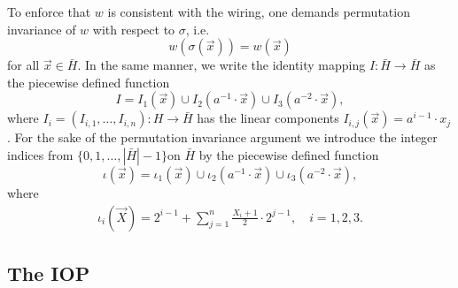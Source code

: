 \documentclass[11pt]{article}
\theoremstyle{definition}
\theoremstyle{remark}
\begin{document}
To enforce that $w$ is consistent with the wiring, one demands permutation invariance of $w$ with respect to $\sigma$, i.e.
\begin{equation}
\label{e:PermutationInvariance}
w (\sigma(\vec x)) =  w(\vec x)
\end{equation}
for all $\vec x\in \bar H$.
In the same manner, we write the identity mapping $I: \bar H\longrightarrow \bar H$ as the piecewise defined function
\[
I = I_1(\vec x) \cup I_2(a^{-1}\cdot \vec x) \cup I_3(a^{-2}\cdot \vec x),
\]
where $I_i = (I_{i,1},\ldots, I_{i,n}): H\rightarrow \bar H$ has the linear components $I_{i,j}(\vec x) = a^{i-1}\cdot  x_j$.
For the sake of the permutation invariance argument we introduce the integer indices from $\{0, 1, \ldots, |\bar H|- 1\}$on $\bar H$ by the piecewise defined function
\begin{equation}
\label{e:iota}
\iota(\vec x) = \iota_1(\vec x) \cup \iota_2(a^{-1}\cdot \vec x) \cup \iota_3(a^{-2}\cdot \vec x),
\end{equation}
where
\begin{align}
\label{e:iotai}
\iota_i (\vec X) = 2^{i-1} + \sum_{j=1}^n \frac{X_i + 1}{2}\cdot 2^{j-1}, \quad i=1,2,3.
\end{align}

\subsection{The IOP}
\end{document}
